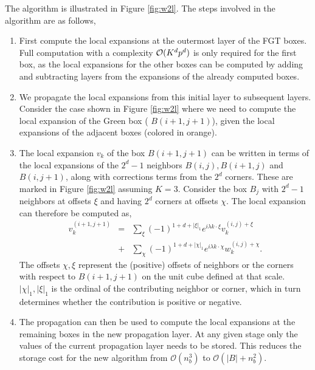 The algorithm is illustrated in Figure \ref{fig:w2l}. The steps involved in the
algorithm are as follows, 
\begin{enumerate}    
  \item First compute the local expansions at the outermost layer of the FGT
    boxes. Full computation with a complexity $\mathcal{O}(K^d p^d)$ is only required for the first box, as
    the local expansions for the other boxes can be computed by adding and
    subtracting layers from the expansions of the already computed boxes. 
  
  \item We propagate the local expansions from this initial layer to subsequent
    layers. Consider the case shown in Figure \ref{fig:w2l} where we need to
    compute the local expansion of the Green box ( $B(i+1,j+1)$), given the
    local expansions of the adjacent boxes (colored in orange).  
  
  \item The local expansion $v_k$ of the box $B(i+1, j+1)$ can be written in terms of the
    local expansions of the $2^d -1$ neighbors $B(i,j), B(i+1,j)$ and
    $B(i,j+1)$, along with corrections terms from the $2^d$ corners.
    These are marked in Figure \ref{fig:w2l} assuming $K=3$. Consider the box $B_j$ with $2^d -1$ neighbors at offsets $\xi$ and having $2^d$ corners at offsets $\chi$. The local expansion can therefore be computed as,
    \begin{eqnarray} 
    v_k^{(i+1,j+1)} &=& \sum_{\xi} (-1)^{1 + d + |\xi|_1} e^{i\lambda k\cdot\xi} v_k^{(i,j)+\xi} \nonumber\\
    & +& \sum_{\chi} (-1)^{1 + d + |\chi|_1} e^{i\lambda k\cdot \chi} w_k^{(i,j)+\chi}. \label{eqn:sweep}
    \end{eqnarray}
    The offsets $\chi, \xi$ represent the (positive) offsets of neighbors or the corners with respect to $B(i+1, j+1)$ on the unit cube defined at that scale. $|\chi|_1, |\xi|_1$ is the ordinal of the contributing neighbor or corner, which in turn determines whether the contribution is positive or negative. 
  
  \item The propagation can then be used to compute the local expansions at the remaining boxes in
    the new propagation layer. At any given stage only the values of the current 
    propagation layer needs to be stored. This reduces the storage cost for the new algorithm from
    $\mathcal{O}(n_b^3)$ to $\mathcal{O}(|B| + n_b^2)$.

\end{enumerate}


